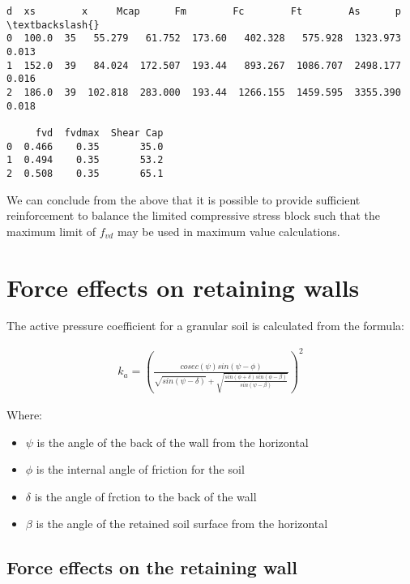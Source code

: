 \documentclass[11pt]{article}
\providecommand{\tightlist}{%
      \setlength{\itemsep}{0pt}\setlength{\parskip}{0pt}}
\begin{document}
    
    \begin{Verbatim}[commandchars=\\\{\}]
       d  xs        x     Mcap      Fm        Fc        Ft        As      p  \textbackslash{}
0  100.0  35   55.279   61.752  173.60   402.328   575.928  1323.973  0.013   
1  152.0  39   84.024  172.507  193.44   893.267  1086.707  2498.177  0.016   
2  186.0  39  102.818  283.000  193.44  1266.155  1459.595  3355.390  0.018   

     fvd  fvdmax  Shear Cap  
0  0.466    0.35       35.0  
1  0.494    0.35       53.2  
2  0.508    0.35       65.1  
    \end{Verbatim}

    
    We can conclude from the above that it is possible to provide sufficient
reinforcement to balance the limited compressive stress block such that
the maximum limit of \(f_{vd}\) may be used in maximum value
calculations.

\hypertarget{force-effects-on-retaining-walls}{%
\section{Force effects on retaining
walls}\label{force-effects-on-retaining-walls}}

The active pressure coefficient for a granular soil is calculated from
the formula:

\begin{align}
k_a = \left(\frac{cosec(\psi) sin(\psi - \phi)}{\sqrt{sin(\psi - \delta)}
+ \sqrt{\frac{sin(\phi+\delta) sin(\phi - \beta)}{sin(\psi-\beta)}}}\right)^2
\end{align}

Where:

\begin{itemize}
\tightlist
\item
  \(\psi\) is the angle of the back of the wall from the horizontal
\item
  \(\phi\) is the internal angle of friction for the soil
\item
  \(\delta\) is the angle of frction to the back of the wall
\item
  \(\beta\) is the angle of the retained soil surface from the
  horizontal
\end{itemize}

\hypertarget{force-effects-on-the-retaining-wall}{%
\subsection{Force effects on the retaining
wall}\label{force-effects-on-the-retaining-wall}}
\end{document}
